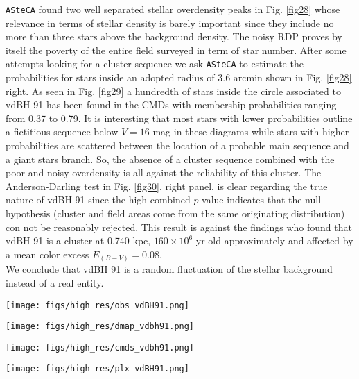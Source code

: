 \documentclass{aa}
\begin{document}
\texttt{ASteCA} found two well separated stellar overdensity peaks in Fig.
\ref{fig28} whose relevance in terms of stellar density is barely important
since they include no more than three stars above the background density. The
noisy RDP proves by itself the poverty of the entire field surveyed in term of
star number. After some attempts looking for a cluster sequence we ask
\texttt{ASteCA} to estimate the probabilities for stars inside an adopted radius
of 3.6 arcmin shown in Fig. \ref{fig28} right. As seen in Fig. \ref{fig29} a
hundredth of stars inside the circle associated to vdBH 91 has
been found in the CMDs with membership probabilities ranging from 0.37 to 0.79.
It is interesting that most stars with lower probabilities outline a fictitious
sequence below $V = 16$ mag in these diagrams while stars with higher
probabilities are scattered between the location of a probable main sequence and
a giant stars branch. So, the absence of a cluster sequence combined with the
poor and noisy overdensity is all against the reliability of this cluster. The
Anderson-Darling test in Fig. \ref{fig30}, right panel, is clear regarding the
true nature of vdBH 91 since the high combined $p$-value
indicates that the null hypothesis (cluster and field areas come from the same
originating distribution) con not be reasonably rejected. This result is against
the \cite{Kharchenko_2005} findings who found
that vdBH 91 is a cluster at 0.740 kpc, $160\times10^6$ yr old
approximately and affected by a mean color excess $E_{(B-V)} = 0.08$.\\

We conclude that vdBH 91 is a random fluctuation of the stellar
background instead of a real entity.

\begin{figure*}[ht]
    \centering
    \texttt{[image: figs/high\_res/obs\_vdBH91.png]}
    \caption{Idem Fig. \ref{fig3} for vdBH 91.}
    \label{fig27}
\end{figure*}
\begin{figure*}[ht]
    \centering
    \texttt{[image: figs/high\_res/dmap\_vdbh91.png]}
    \caption{Idem Fig. \ref{fig4} for vdBH 91.}
    \label{fig28}
\end{figure*}
\begin{figure*}[ht]
    \centering
    \texttt{[image: figs/high\_res/cmds\_vdbh91.png]}
    \caption{Idem Fig. \ref{fig5} for vdBH 91.}
    \label{fig29}
\end{figure*}
\begin{figure*}[ht]
    \centering
    \texttt{[image: figs/high\_res/plx\_vdBH91.png]}
    \caption{Idem Fig. \ref{fig6} for vdBH 91.}
    \label{fig30}
\end{figure*}
\end{document}
